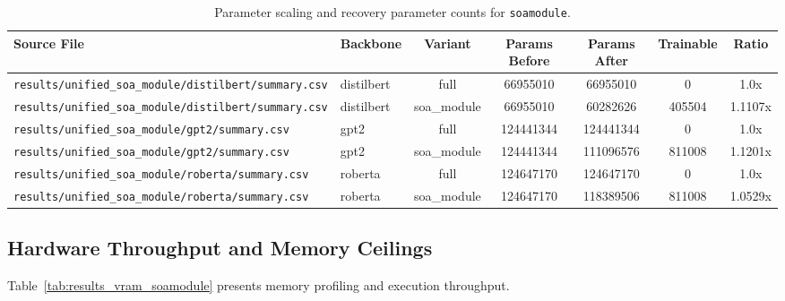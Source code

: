 \begin{table}[t]
\centering
\small
\begin{tabular}{llccccc}
\toprule
\textbf{Source File} & \textbf{Backbone} & \textbf{Variant} & \textbf{Params Before} & \textbf{Params After} & \textbf{Trainable} & \textbf{Ratio} \\
\midrule
\texttt{results/unified\_soa\_module/distilbert/summary.csv} & distilbert & full & 66955010 & 66955010 & 0 & 1.0x \\
\texttt{results/unified\_soa\_module/distilbert/summary.csv} & distilbert & soa\_module & 66955010 & 60282626 & 405504 & 1.1107x \\
\texttt{results/unified\_soa\_module/gpt2/summary.csv} & gpt2 & full & 124441344 & 124441344 & 0 & 1.0x \\
\texttt{results/unified\_soa\_module/gpt2/summary.csv} & gpt2 & soa\_module & 124441344 & 111096576 & 811008 & 1.1201x \\
\texttt{results/unified\_soa\_module/roberta/summary.csv} & roberta & full & 124647170 & 124647170 & 0 & 1.0x \\
\texttt{results/unified\_soa\_module/roberta/summary.csv} & roberta & soa\_module & 124647170 & 118389506 & 811008 & 1.0529x \\
\bottomrule
\end{tabular}
\caption{Parameter scaling and recovery parameter counts for \texttt{soamodule}.}
\label{tab:results_params_soamodule}
\end{table}

\subsection{Hardware Throughput and Memory Ceilings}
Table~\ref{tab:results_vram_soamodule} presents memory profiling and execution throughput.

